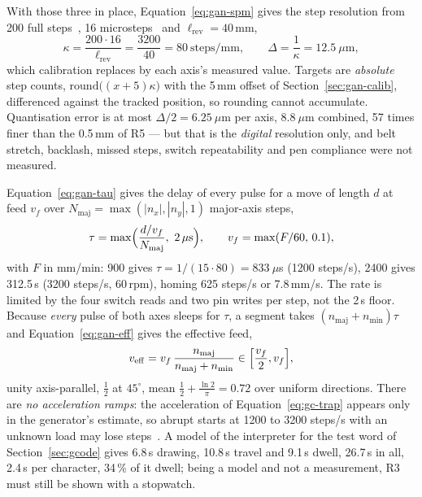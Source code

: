 With those three in place, Equation~\ref{eq:gan-spm} gives the step resolution from 200 full steps~\cite{stepperds}, 16 microsteps~\cite{a4988ds} and $\ell_{\mathrm{rev}}=40$\,mm,
\begin{equation}
\kappa=\frac{200\cdot16}{\ell_{\mathrm{rev}}}=\frac{3200}{40}=80\ \mathrm{steps/mm},\qquad\Delta=\frac1\kappa=12.5\ \mu\mathrm{m},
\label{eq:gan-spm}
\end{equation}
which calibration replaces by each axis's measured value. Targets are \emph{absolute} step counts, $\mathrm{round}\bigl((x+5)\kappa\bigr)$ with the 5\,mm offset of Section~\ref{sec:gan-calib}, differenced against the tracked position, so rounding cannot accumulate. Quantisation error is at most $\Delta/2=6.25\ \mu$m per axis, $8.8\ \mu$m combined, 57 times finer than the 0.5\,mm of R5 --- but that is the \emph{digital} resolution only, and belt stretch, backlash, missed steps, switch repeatability and pen compliance were not measured. 

Equation~\ref{eq:gan-tau} gives the delay of every pulse for a move of length $d$ at feed $v_f$ over $N_{\mathrm{maj}}=\max(|n_x|,|n_y|,1)$ major-axis steps,
\begin{equation}
\tau=\max\Bigl(\frac{d/v_f}{N_{\mathrm{maj}}},\ 2\,\mu\mathrm s\Bigr),\qquad v_f=\max(F/60,\,0.1),
\label{eq:gan-tau}
\end{equation}
with $F$ in mm/min: 900 gives $\tau=1/(15\cdot80)=833\ \mu$s (1200 steps/s), 2400 gives 312.5\,\textmu s (3200 steps/s, 60\,rpm), homing 625 steps/s or 7.8\,mm/s. The rate is limited by the four switch reads and two pin writes per step, not the 2\,\textmu s floor.  Because \emph{every} pulse of both axes sleeps for $\tau$, a segment takes $(n_{\mathrm{maj}}+n_{\mathrm{min}})\tau$ and Equation~\ref{eq:gan-eff} gives the effective feed,
\begin{equation}
v_{\mathrm{eff}}=v_f\,\frac{n_{\mathrm{maj}}}{n_{\mathrm{maj}}+n_{\mathrm{min}}}\in\Bigl[\frac{v_f}{2},v_f\Bigr],
\label{eq:gan-eff}
\end{equation}
unity axis-parallel, $\tfrac12$ at $45^\circ$, mean $\frac12+\frac{\ln2}{\pi}=0.72$ over uniform directions. There are \emph{no acceleration ramps}: the acceleration of Equation~\ref{eq:gc-trap} appears only in the generator's estimate, so abrupt starts at 1200 to 3200 steps/s with an unknown load may lose steps~\cite{acarnley2002}. A model of the interpreter for the test word of Section~\ref{sec:gcode} gives 6.8\,s drawing, 10.8\,s travel and 9.1\,s dwell, 26.7\,s in all, 2.4\,s per character, 34\,\% of it dwell; being a model and not a measurement, R3 must still be shown with a stopwatch.

